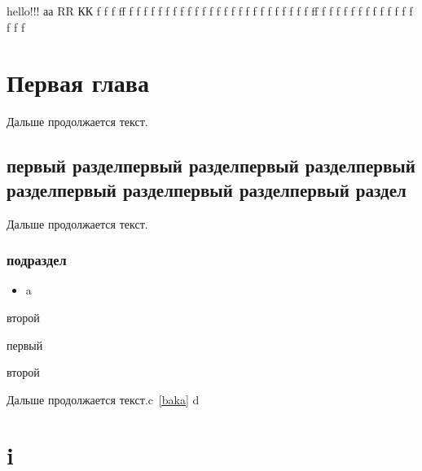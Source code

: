 \documentclass[type=thesis]{bsuir}
\begin{document}
hello!!! аа RR КК f f f ff f f f f f f f f   f f f f f f f f f f f  f
f f f f f ff f  f f f f f   f f f f f f f f f f

\tableofcontents

\chapter{Первая глава}
Дальше продолжается текст.

\section{первый разделпервый разделпервый разделпервый разделпервый
разделпервый разделпервый раздел}
Дальше продолжается текст.

\subsection{подраздел}

\begin{itemize}
  \item a
\end{itemize}
\begin{alphabetize}
\item второй
  \begin{alphabetize}
  \item первый
  \item второй\label{baka}
  \end{alphabetize}
\end{alphabetize}

Дальше продолжается текст.c~\ref{baka} d

\appendix

\chapter{i}
\end{document}
